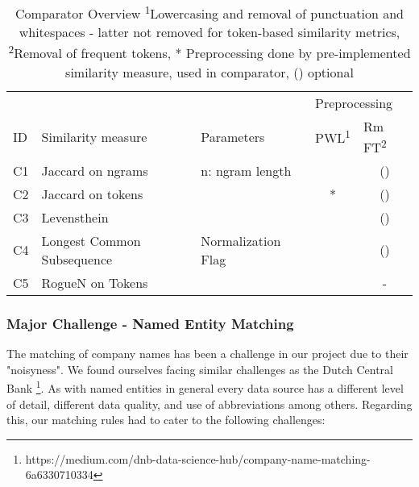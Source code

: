 \documentclass[11pt,titlepage,oneside,openany]{article}
\begin{document}
\begin{table}[t]
	\small
	\begin{tabular}{lllcc}
		& \multicolumn{2}{l}{}                              & \multicolumn{2}{l}{Preprocessing}                   \\
		ID & Similarity   measure       & Parameters           & \multicolumn{1}{l}{PWL\textsuperscript{1}} & \multicolumn{1}{l}{Rm FT\textsuperscript{2}} \\\hline
		C1  & Jaccard on ngrams          & n: ngram   length    & \checked & (\checked)              \\
		C2  & Jaccard on tokens          &                      & *                       & (\checked)                       \\
		C3  & Levensthein                &                      & \checked & (\checked)                       \\
		C4  & Longest Common Subsequence & Normalization   Flag & \checked & (\checked)                       \\
		C5  & RogueN on Tokens \cite{lin_rouge_2004} & & \checked & -                      
	\end{tabular}

\caption[Comparator Overview]%
{Comparator Overview \small\medspace\medspace \textsuperscript{1}Lowercasing and removal of punctuation and whitespaces -  latter not removed for token-based similarity metrics, \textsuperscript{2}Removal of frequent tokens, * Preprocessing done by pre-implemented similarity measure, \checked \space used in comparator, (\checked) optional}
\label{table:comparators}

\end{table}

\subsubsection{Major Challenge - Named Entity Matching}
\label{sec:challenges}

The matching of company names has been a challenge in our project due to their "noisyness". We found ourselves facing similar challenges as the Dutch Central Bank \footnote{https://medium.com/dnb-data-science-hub/company-name-matching-6a6330710334}. %
As with named entities in general every data source has a different level of detail, different data quality, and use of abbreviations among others. Regarding this, our matching rules had to cater to the following challenges:
\end{document}
